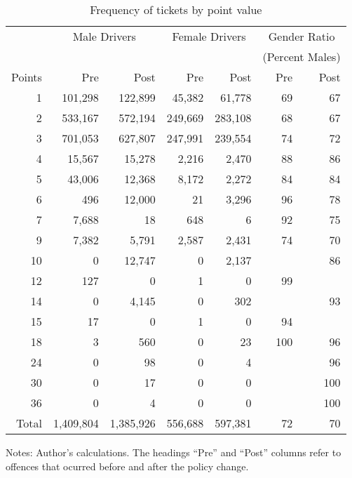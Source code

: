 
\begin{table}%
\centering
\begin{tabular}{r r r r r r r}
  \hline
		& \multicolumn{2}{c}{Male Drivers} 	&  \multicolumn{2}{c}{Female Drivers} &  \multicolumn{2}{c}{Gender Ratio} \\
 & & & & & \multicolumn{2}{c}{(Percent Males)} \\

 \cmidrule(lr){2-3}\cmidrule(lr){4-5}\cmidrule(lr){6-7} 
Points 	& Pre 		& Post		& Pre 		& Post		& Pre 	& Post		\\ 
  \hline
1 		& 101,298 	& 122,899	&  45,382 	&   61,778 	& 69 	& 67 \\ 
2 		& 533,167 	& 572,194	& 249,669 	& 283,108 	& 68 	& 67 \\ 
3 		& 701,053 	& 627,807	& 247,991	& 239,554	& 74 	& 72 \\ 
4 		&  15,567 	&  15,278 	&    2,216 	&    2,470 	& 88 	& 86 \\ 
5 		&  43,006 	&  12,368 	&    8,172 	&    2,272 	& 84 	& 84 \\ 
6 		&     496 	&  12,000 	&        21 	&    3,296 	& 96 	& 78 \\ 
7 		&   7,688 	&        18 	&      648 	&          6 	& 92 	& 75 \\ 
9 		&   7,382 	&    5,791 	&    2,587 	&    2,431 	& 74 	& 70 \\ 
10 		&         0 	&  12,747 	&         0 	&    2,137 	&  		& 86 \\ 
12 		&     127	&         0 	&         1 	&         0 	& 99 	&  \\ 
14 		&       0 	&   4,145 	&         0 	&      302 	&  		& 93 \\ 
15 		&      17 	&         0 	&         1 	&         0 	& 94 	&  \\ 
18 		&       3 	&      560 	&         0 	&        23 	& 100 	& 96 \\ 
24 		&       0 	&       98 	&         0 	&         4 	&  		& 96 \\ 
30 		&       0 	&       17 	&         0 	&         0 	&  		& 100 \\ 
36 		&       0 	&        4 	&         0 	&         0 	&  		& 100 \\ 

   \hline

Total 	  & 1,409,804 & 1,385,926 & 556,688 & 597,381 & 72 & 70 \\ 

   \hline
\end{tabular}
\caption{Frequency of tickets by point value} 
Notes: Author’s calculations. The headings ``Pre'' and ``Post'' columns refer to offences that ocurred before and after the policy change.
\label{tab:penalties}
\end{table}